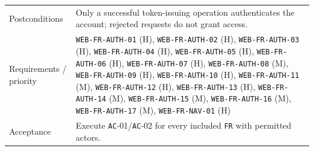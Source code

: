 \begin{longtable}{@{}P{0.20000\SRSWidth}P{0.80000\SRSWidth}@{}}
Postconditions & Only a successful token-issuing operation authenticates the account; rejected requests do not grant access. \\[3pt]
Requirements /\allowbreak{} priority & \texttt{WEB-\allowbreak{}FR-\allowbreak{}AUTH-\allowbreak{}01} (H), \texttt{WEB-\allowbreak{}FR-\allowbreak{}AUTH-\allowbreak{}02} (H), \texttt{WEB-\allowbreak{}FR-\allowbreak{}AUTH-\allowbreak{}03} (H), \texttt{WEB-\allowbreak{}FR-\allowbreak{}AUTH-\allowbreak{}04} (H), \texttt{WEB-\allowbreak{}FR-\allowbreak{}AUTH-\allowbreak{}05} (H), \texttt{WEB-\allowbreak{}FR-\allowbreak{}AUTH-\allowbreak{}06} (H), \texttt{WEB-\allowbreak{}FR-\allowbreak{}AUTH-\allowbreak{}07} (H), \texttt{WEB-\allowbreak{}FR-\allowbreak{}AUTH-\allowbreak{}08} (M), \texttt{WEB-\allowbreak{}FR-\allowbreak{}AUTH-\allowbreak{}09} (H), \texttt{WEB-\allowbreak{}FR-\allowbreak{}AUTH-\allowbreak{}10} (H), \texttt{WEB-\allowbreak{}FR-\allowbreak{}AUTH-\allowbreak{}11} (M), \texttt{WEB-\allowbreak{}FR-\allowbreak{}AUTH-\allowbreak{}12} (H), \texttt{WEB-\allowbreak{}FR-\allowbreak{}AUTH-\allowbreak{}13} (H), \texttt{WEB-\allowbreak{}FR-\allowbreak{}AUTH-\allowbreak{}14} (M), \texttt{WEB-\allowbreak{}FR-\allowbreak{}AUTH-\allowbreak{}15} (M), \texttt{WEB-\allowbreak{}FR-\allowbreak{}AUTH-\allowbreak{}16} (M), \texttt{WEB-\allowbreak{}FR-\allowbreak{}AUTH-\allowbreak{}17} (M), \texttt{WEB-\allowbreak{}FR-\allowbreak{}NAV-\allowbreak{}01} (H) \\[3pt]
Acceptance & Execute \texttt{AC}-01/\allowbreak{}\texttt{AC}-02 for every included \texttt{FR} with permitted actors. \\[3pt]
\end{longtable}
\endgroup

